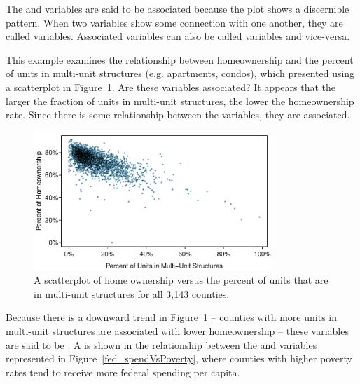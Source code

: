 
The  and  variables are said to be associated because the plot shows a discernible pattern. When two variables show some connection with one another, they are called  variables. Associated variables can also be called  variables and vice-versa.

\begin{example}{This example examines the relationship between homeownership and the percent of units in multi-unit structures (e.g. apartments, condos), which presented using a scatterplot in Figure~\ref{multiunitsVsOwnership}. Are these variables associated?}
It appears that the larger the fraction of units in multi-unit structures, the lower the homeownership rate. Since there is some relationship between the variables, they are associated.
\end{example}
\begin{figure}
   \centering
   \includegraphics[width=0.8\textwidth]{01/figures/multiunitsVsOwnership/multiunitsVsOwnership}
   \caption{A scatterplot of home ownership versus the percent of units that are in multi-unit structures for all 3,143 counties.}
   \label{multiunitsVsOwnership}
\end{figure}

Because there is a downward trend in Figure~\ref{multiunitsVsOwnership} -- counties with more units in multi-unit structures are associated with lower homeownership -- these variables are said to be . A  is shown in the relationship between the  and  variables represented in Figure~\ref{fed_spendVsPoverty}, where counties with higher poverty rates tend to receive more federal spending per capita.

